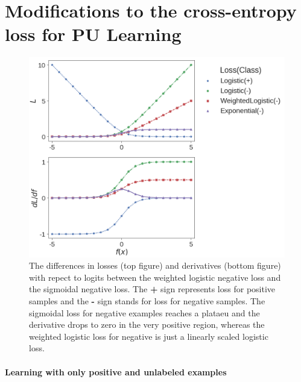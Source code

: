 \section{Modifications to the cross-entropy loss for PU Learning}
\label{sec:pulearning}



\begin{figure}[t]
\centering
   \includegraphics[width=1.05\linewidth]{img/losses}
\caption{
The differences in losses (top figure) and derivatives (bottom figure) with repect to logits between the weighted logistic negative loss and the sigmoidal negative loss.
The \textbf{+} sign represents loss for positive samples and the \textbf{-} sign stands for loss for negative samples.
The sigmoidal loss for negative examples reaches a plataeu and the derivative drops to zero in the very positive region, whereas the weighted logistic loss for negative is just a linearly scaled logistic loss.
}
\label{fig:losses}
\end{figure}


\paragraph{Learning with only positive and unlabeled examples}

